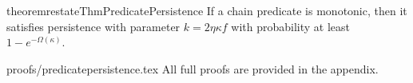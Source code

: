 \begin{restatable}{theorem}{restateThmPredicatePersistence}
    If a chain predicate is monotonic, then it satisfies persistence with
    parameter $k = 2\eta \kappa f$ with probability at least $1 -
    e^{-\Omega(\kappa)}$.
\end{restatable}
\ifonecolumn
    {proofs/predicatepersistence.tex}
\else
    All full proofs are provided in the appendix.
\fi

